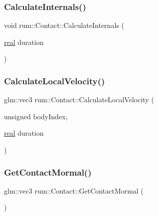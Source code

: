 \subsubsection{\texorpdfstring{Calculate\+Internals()}{CalculateInternals()}}
{\footnotesize\ttfamily void rum\+::\+Contact\+::\+Calculate\+Internals (\begin{DoxyParamCaption}\item[{\hyperlink{namespacerum_a7e8cca23573d5eaead0f138cbaa4862c}{real}}]{duration }\end{DoxyParamCaption})\hspace{0.3cm}{\ttfamily [protected]}}

\mbox{\label{classrum_1_1_contact_ad10049d2987b416faf35fc84817e6a1c}} 
\subsubsection{\texorpdfstring{Calculate\+Local\+Velocity()}{CalculateLocalVelocity()}}
{\footnotesize\ttfamily glm\+::vec3 rum\+::\+Contact\+::\+Calculate\+Local\+Velocity (\begin{DoxyParamCaption}\item[{unsigned}]{body\+Index,  }\item[{\hyperlink{namespacerum_a7e8cca23573d5eaead0f138cbaa4862c}{real}}]{duration }\end{DoxyParamCaption})\hspace{0.3cm}{\ttfamily [protected]}}

\mbox{\label{classrum_1_1_contact_a4f3310ec7a77f61dbf8733b0fe127550}} 
\subsubsection{\texorpdfstring{Get\+Contact\+Mormal()}{GetContactMormal()}}
{\footnotesize\ttfamily glm\+::vec3 rum\+::\+Contact\+::\+Get\+Contact\+Mormal (\begin{DoxyParamCaption}{ }\end{DoxyParamCaption})}

